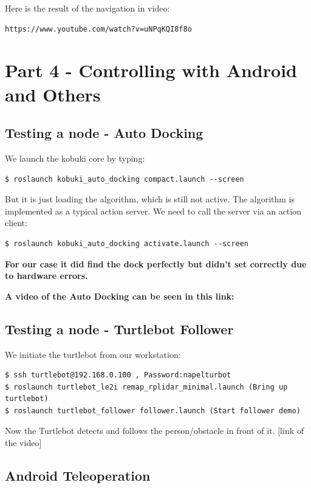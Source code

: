 \documentclass[10pt,a4paper]{article}
\begin{document}
Here is the result of the navigation in video: 
\begin{lstlisting}[frame=single]
https://www.youtube.com/watch?v=uNPqKQI8f8o
\end{lstlisting}

\section{Part 4 - Controlling with Android and Others}

\subsection{Testing a node - Auto Docking}
We launch the kobuki core by typing:

\begin{lstlisting}[frame=single] 
$ roslaunch kobuki_auto_docking compact.launch --screen
\end{lstlisting}
But it is just loading the algorithm, which is still not active. The algorithm is implemented as a typical action server. We need to call the server via an action client:

\begin{lstlisting}[frame=single] 
$ roslaunch kobuki_auto_docking activate.launch --screen
\end{lstlisting}

\textbf{For our case it did find the dock perfectly but didn't set correctly due to hardware errors.}

\textbf{A video of the Auto Docking can be seen in this link:}\\

\subsection{Testing a node - Turtlebot Follower}
We initiate the turtlebot from our workstation:
\begin{lstlisting}[frame=single]
$ ssh turtlebot@192.168.0.100 , Password:napelturbot
$ roslaunch turtlebot_le2i remap_rplidar_minimal.launch (Bring up turtlebot)
$ roslaunch turtlebot_follower follower.launch (Start follower demo)
\end{lstlisting}
Now the Turtlebot detects and follows the person/obstacle in front of it.
[link of the video]

\subsection{Android Teleoperation}
\end{document}

